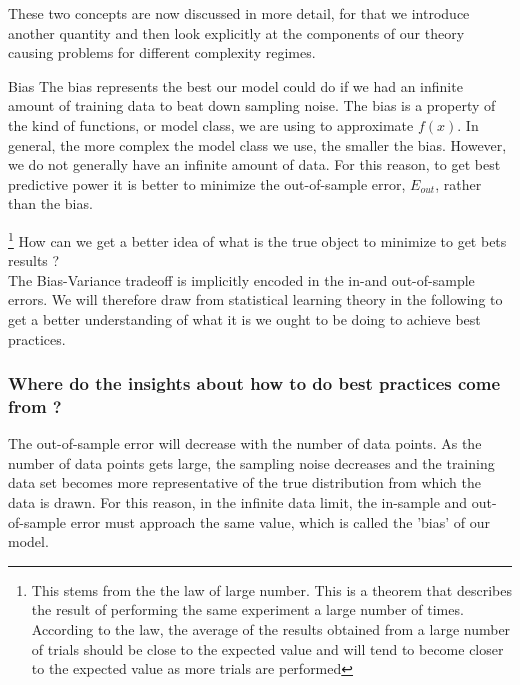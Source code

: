 These two concepts are now discussed in more detail, for that we introduce another quantity and then look explicitly at the components of our theory causing problems for different complexity regimes.
\begin{mybox}{Bias}
	The bias represents the best our model could do if we had an infinite amount of training data to beat down sampling noise. The bias is a property of the kind of functions, or model class, we are using to approximate $f(x)$. In general, the more complex the model class we use, the smaller the bias. However, we do not generally have an infinite amount of data. For this reason, to get best predictive power it is better to minimize the out-of-sample error, $E_{out}$, rather than the bias. 
\end{mybox}\footnote{This stems from the the law of large number. This is a theorem that describes the result of performing the same experiment a large number of times. According to the law, the average of the results obtained from a large number of trials should be close to the expected value and will tend to become closer to the expected value as more trials are performed}
How can we get a better idea of what is the true object to minimize to get bets results ? \\
The Bias-Variance tradeoff is implicitly encoded in the in-and out-of-sample errors. We will therefore draw from statistical learning theory in the following to get a better understanding of what it is we ought to be doing to achieve best practices.\\
\subsubsection{Where do the insights about how to do best practices come from ?}
The out-of-sample error will decrease with the number of data points. As the number of data points gets large, the sampling noise decreases and the training data set becomes more representative of the true distribution from which the data is drawn. For this reason, in the infinite data limit, the in-sample and out-of-sample error must approach the same value, which is called the ’bias’ of our model.

